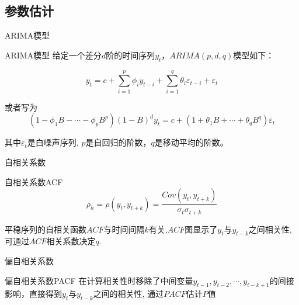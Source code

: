 \documentclass[10pt]{beamer}
\begin{document}
\subsection{参数估计}
\begin{frame}{ARIMA模型}
\begin{block}{ARIMA模型}
  给定一个差分\(d\)阶的时间序列\(y_t\)，\(ARIMA(p,d,q)\)模型如下：

  \[y_t=c+\sum_{i=1}^p{\phi_i y_{t-i}}+\sum_{i=1}^q{\theta_i\varepsilon_{t-i}}+\varepsilon_t \]

  或者写为\[(1-\phi_1B - \cdots - \phi_p B^p)  (1-B)^d y_{t} = c + (1 + \theta_1 B + \cdots + \theta_q B^q)\varepsilon_t\]

  其中\(\varepsilon_t\)是白噪声序列, \(p\)是自回归的阶数，\(q\)是移动平均的阶数。
\end{block}
\end{frame}

\begin{frame}{自相关系数}
  \begin{block}{自相关系数ACF}
    \[\rho_h = \rho(y_t,y_{t+k}) =\frac{Cov(y_t,y_{t+k})}{\sigma_t \sigma_{t+k}}\]
  \end{block}

  平稳序列的自相关函数\(ACF\)与时间间隔\(k\)有关,\(ACF\)图显示了\(y_t\)与\(y_{t-k}\)之间相关性,
  可通过\(ACF\)相关系数决定\(q\).
\end{frame}

\begin{frame}{偏自相关系数}
  \begin{block}{偏自相关系数PACF}
    在计算相关性时移除了中间变量\(y_{t-1},
    y_{t-2},\cdots,y_{t-k+1}\)的间接影响，直接得到\(y_t\)与\(y_{t-k}\)之间的相关性,
    通过\(PACF\)估计\(P\)值
  \end{block}
\end{frame}
\end{document}
